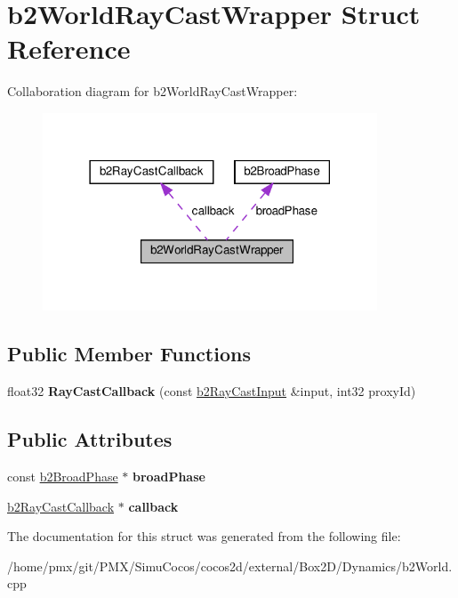 \hypertarget{structb2WorldRayCastWrapper}{}\section{b2\+World\+Ray\+Cast\+Wrapper Struct Reference}
\label{structb2WorldRayCastWrapper}


Collaboration diagram for b2\+World\+Ray\+Cast\+Wrapper\+:
\nopagebreak
\begin{figure}[H]
\begin{center}
\leavevmode
\includegraphics[width=282pt]{structb2WorldRayCastWrapper__coll__graph}
\end{center}
\end{figure}
\subsection*{Public Member Functions}
\begin{DoxyCompactItemize}
\item 
\mbox{\label{structb2WorldRayCastWrapper_a336aa5b664c3cfea61b0e28066f796d4}} 
float32 {\bfseries Ray\+Cast\+Callback} (const \hyperlink{structb2RayCastInput}{b2\+Ray\+Cast\+Input} \&input, int32 proxy\+Id)
\end{DoxyCompactItemize}
\subsection*{Public Attributes}
\begin{DoxyCompactItemize}
\item 
\mbox{\label{structb2WorldRayCastWrapper_a8bf380db0756a568bec076e549544145}} 
const \hyperlink{classb2BroadPhase}{b2\+Broad\+Phase} $\ast$ {\bfseries broad\+Phase}
\item 
\mbox{\label{structb2WorldRayCastWrapper_a5e6d85af5ae2cda7a8da2306d6b86a3e}} 
\hyperlink{classb2RayCastCallback}{b2\+Ray\+Cast\+Callback} $\ast$ {\bfseries callback}
\end{DoxyCompactItemize}


The documentation for this struct was generated from the following file\+:\begin{DoxyCompactItemize}
\item 
/home/pmx/git/\+P\+M\+X/\+Simu\+Cocos/cocos2d/external/\+Box2\+D/\+Dynamics/b2\+World.\+cpp\end{DoxyCompactItemize}
